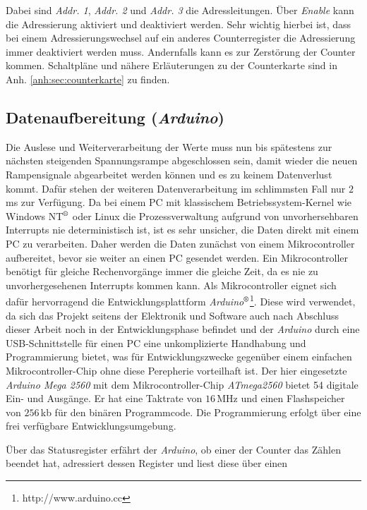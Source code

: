 Dabei sind \textit{Addr. 1}, \textit{Addr. 2} und \textit{Addr. 3} die
Adressleitungen. Über \textit{Enable} kann die Adressierung aktiviert und
deaktiviert werden. Sehr wichtig hierbei ist, dass bei einem Adressierungswechsel auf ein anderes
Counterregister die Adressierung immer deaktiviert werden muss. Andernfalls kann
es zur Zerstörung der Counter kommen. Schaltpläne und nähere Erläuterungen
zu der Counterkarte sind in Anh. \ref{anh:sec:counterkarte} zu finden.

\subsection{Datenaufbereitung (\textit{Arduino})}\label{subsec:arduino}
Die Auslese und Weiterverarbeitung der Werte muss nun bis spätestens zur
nächsten steigenden Spannungsrampe abgeschlossen sein, damit wieder die neuen
Rampensignale abgearbeitet werden können und es zu keinem Datenverlust kommt.
Dafür stehen der weiteren Datenverarbeitung im schlimmsten Fall nur $2\,$ms zur
Verfügung. Da bei einem PC mit klassischem Betriebssystem-Kernel wie Windows
NT$^\text{\textregistered}$ oder Linux die Prozessverwaltung aufgrund von
unvorhersehbaren Interrupts nie deterministisch ist, ist es sehr unsicher, die
Daten direkt mit einem PC zu verarbeiten. Daher werden die Daten zunächst von einem Mikrocontroller
aufbereitet, bevor sie weiter an einen PC gesendet werden. Ein Mikrocontroller
benötigt für gleiche Rechenvorgänge immer die gleiche Zeit, da es nie zu
unvorhergesehenen Interrupts kommen kann. Als Mikrocontroller eignet sich dafür
hervorragend die Entwicklungsplattform \textit{Arduino$^\text{\textregistered}$}\footnote{http://www.arduino.cc}. Diese
wird verwendet, da sich das Projekt seitens der Elektronik und Software
auch nach Abschluss dieser Arbeit noch in der Entwicklungsphase befindet und der
\textit{Arduino} durch eine USB-Schnittstelle für einen PC eine unkomplizierte
Handhabung und Programmierung bietet, was für Entwicklungszwecke gegenüber einem
einfachen Mikrocontroller-Chip ohne diese Perepherie vorteilhaft ist. Der hier eingesetzte
\textit{Arduino Mega 2560} mit dem Mikrocontroller-Chip \textit{ATmega2560}
bietet 54 digitale Ein- und Ausgänge. Er hat eine Taktrate von $16\,$MHz und
einen Flashspeicher von $256\,$kb für den binären Programmcode.
Die Programmierung erfolgt über eine frei verfügbare Entwicklungsumgebung.\par
Über das Statusregister erfährt der \textit{Arduino}, ob einer der Counter das Zählen
beendet hat, adressiert dessen Register und liest diese über einen
